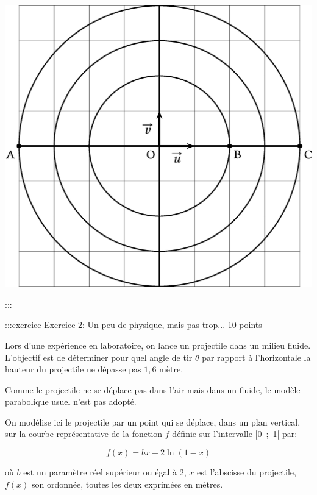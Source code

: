 \documentclass{cornouaille}
\begin{document}
\includegraphics{./TS-Complexes-Loga-1}






:::




\newpage



:::exercice Exercice 2: Un peu de physique, mais pas trop... 10 points


Lors d'une expérience en laboratoire, on lance un projectile dans un milieu fluide. L'objectif est de déterminer pour quel angle de tir
$\theta$ par rapport à l'horizontale la hauteur du projectile ne dépasse
pas $1,6$ mètre.

Comme le projectile ne se déplace pas dans l'air mais dans un
fluide, le modèle parabolique usuel n'est pas adopté.

On modélise ici le projectile par un point qui se déplace, dans un
plan vertical, sur la courbe représentative de la fonction $f$ définie
sur l'intervalle [0~;~1[ par:


$$
f(x) = bx + 2\ln (1- x)
$$


où $b$ est un paramètre réel supérieur ou égal à $2$, $x$ est l'abscisse
du projectile, $f(x)$ son ordonnée, toutes les deux exprimées en mètres.



\end{document}
